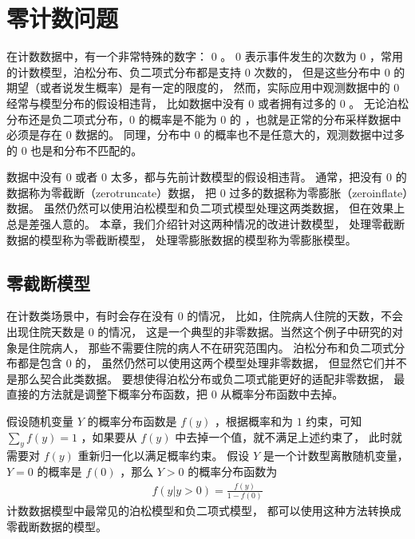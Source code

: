 \documentclass[letterpaper,10pt,english]{sphinxmanual}
\begin{document}
\chapter{零计数问题}
\label{\detokenize{_u96f6_u8ba1_u6570_u95ee_u9898/content:id1}}\label{\detokenize{_u96f6_u8ba1_u6570_u95ee_u9898/content::doc}}
在计数数据中，有一个非常特殊的数字： \(0\)
。
\(0\) 表示事件发生的次数为 \(0\)
，常用的计数模型，泊松分布、负二项式分布都是支持 \(0\) 次数的，
但是这些分布中 \(0\) 的期望（或者说发生概率）是有一定的限度的，
然而，实际应用中观测数据中的 \(0\) 经常与模型分布的假设相违背，
比如数据中没有 \(0\) 或者拥有过多的 \(0\)
。
无论泊松分布还是负二项式分布，\(0\) 的概率是不能为 \(0\) 的
，也就是正常的分布采样数据中必须是存在 \(0\) 数据的。
同理，分布中 \(0\) 的概率也不是任意大的，观测数据中过多的 \(0\)
也是和分布不匹配的。

数据中没有 \(0\) 或者 \(0\) 太多，都与先前计数模型的假设相违背。
通常，把没有 \(0\) 的数据称为零截断（zero\sphinxhyphen{}truncate）数据，
把 \(0\) 过多的数据称为零膨胀（zero\sphinxhyphen{}inflate）数据。
虽然仍然可以使用泊松模型和负二项式模型处理这两类数据，
但在效果上总是差强人意的。
本章，我们介绍针对这两种情况的改进计数模型，
处理零截断数据的模型称为零截断模型，
处理零膨胀数据的模型称为零膨胀模型。


\section{零截断模型}
\label{\detokenize{_u96f6_u8ba1_u6570_u95ee_u9898/content:id2}}
在计数类场景中，有时会存在没有 \(0\) 的情况，
比如，住院病人住院的天数，不会出现住院天数是 \(0\) 的情况，
这是一个典型的非零数据。当然这个例子中研究的对象是住院病人，
那些不需要住院的病人不在研究范围内。
泊松分布和负二项式分布都是包含 \(0\) 的，
虽然仍然可以使用这两个模型处理非零数据，
但显然它们并不是那么契合此类数据。
要想使得泊松分布或负二项式能更好的适配非零数据，
最直接的方法就是调整下概率分布函数，把 \(0\)
从概率分布函数中去掉。

假设随机变量 \(Y\) 的概率分布函数是 \(f(y)\)
，根据概率和为 \(1\) 约束，可知 \(\sum_{y} f(y) = 1\)
，如果要从 \(f(y)\) 中去掉一个值，就不满足上述约束了，
此时就需要对 \(f(y)\) 重新归一化以满足概率约束。
假设 \(Y\) 是一个计数型离散随机变量，
\(Y=0\) 的概率是 \(f(0)\)
，那么 \(Y>0\) 的概率分布函数为
\begin{equation}\label{equation:零计数问题/content:eq_zero_counts_001}
\begin{split}f(y|y>0) = \frac{f(y)}{1-f(0)}\end{split}
\end{equation}
计数数据模型中最常见的泊松模型和负二项式模型，
都可以使用这种方法转换成零截断数据的模型。
\end{document}
